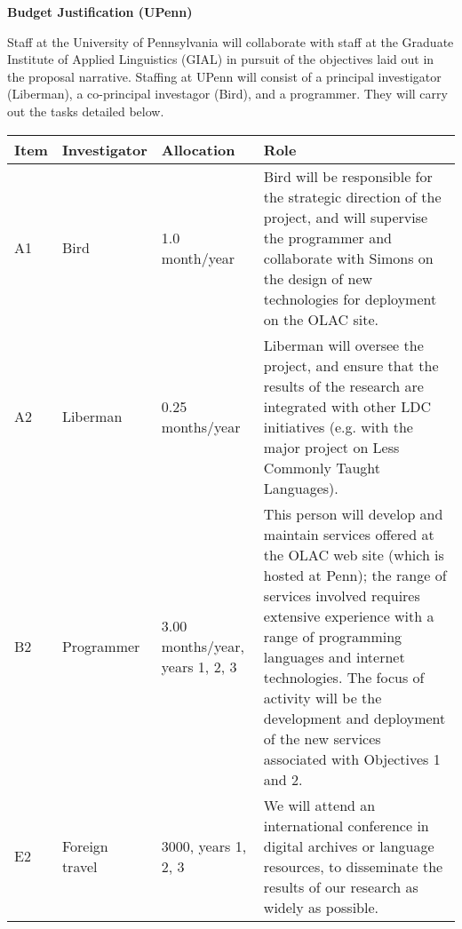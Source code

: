 \documentclass[11pt]{nsf}
\begin{document}
\begin{center}\textbf{\Large
Budget Justification (UPenn)
}\end{center}

Staff at the University of Pennsylvania will collaborate with staff at
the Graduate Institute of Applied Linguistics (GIAL) in pursuit of
the objectives laid out in the proposal narrative.
Staffing at UPenn will consist of a principal investigator (Liberman),
a co-principal investagor (Bird), and a programmer.  They will carry
out the tasks detailed below.

\vspace{1ex}

{\small\noindent
\begin{tabular}{lllp{3in}}
\textbf{Item} &
\textbf{Investigator} & \textbf{Allocation} & \textbf{Role} \\ \hline

A1 & Bird & 1.0 month/year &
Bird will be responsible for the strategic direction of the project,
and will supervise the programmer and collaborate with Simons on the
design of new technologies for deployment on the OLAC site.\\

A2 & Liberman & 0.25 months/year &
Liberman will oversee the project, and ensure that the results of the
research are integrated with other LDC initiatives (e.g. with the
major project on Less Commonly Taught Languages).\\

B2 & Programmer & 3.00 months/year, years 1, 2, 3 &
This person will develop and maintain services offered at the
OLAC web site (which is hosted at Penn); the range of services
involved requires extensive experience with
a range of programming languages and internet technologies.
The focus of activity will be the development and deployment
of the new services associated with Objectives 1 and 2.\\

E2 & Foreign travel & 3000, years 1, 2, 3 &
We will attend an international conference in digital archives or
language resources, to disseminate the results of our research as
widely as possible. \\

\end{tabular}}
\end{document}
